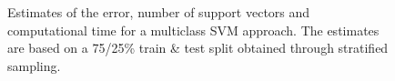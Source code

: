\begin{figure}[!htb]
\centering
\begin{minipage}{\textwidth}
        \centering
        \hfil
	\hfil
	\hfil
\end{minipage}
\caption{Estimates of the error, number of support vectors and computational time for a multiclass SVM approach. The estimates are based on a 75/25\% train \& test split obtained through stratified sampling.}
\label{shuttlemultiestimates}
\end{figure}

